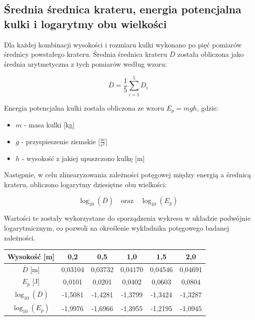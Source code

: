 \documentclass[a4paper,12pt]{article}
\begin{document}

\subsection{Średnia średnica krateru, energia potencjalna kulki i logarytmy obu wielkości}


Dla każdej kombinacji wysokości i rozmiaru kulki wykonano po pięć pomiarów średnicy powstałego krateru. Średnia średnica krateru $\overline{D}$ została obliczona jako średnia arytmetyczna z tych pomiarów według wzoru:

\[ \overline{D} = \frac{1}{5}\sum_{i=1}^{5} D_i \]

Energia potencjalna kulki została obliczona ze wzoru $E_p = mgh$, gdzie:
\begin{itemize}
    \item $m$ - masa kulki [kg]
    \item $g$ - przyspieszenie ziemskie [$\frac{m}{s^2}$]
    \item $h$ - wysokość z jakiej upuszczono kulkę [m]
\end{itemize}

Następnie, w celu zlinearyzowania zależności potęgowej między energią a średnicą krateru, obliczono logarytmy dziesiętne obu wielkości:

\[ \log_{10}(\overline{D}) \quad \text{oraz} \quad \log_{10}(E_p) \]

Wartości te zostały wykorzystane do sporządzenia wykresu w układzie podwójnie logarytmicznym, co pozwoli na określenie wykładnika potęgowego badanej zależności.


\begin{center}
    \begin{tabular}{|c|c|c|c|c|c|}
        \hline
        Wysokość [m] & 0,2 & 0,5 & 1,0 & 1,5 & 2,0 \\
        \hline
        $\overline{D}$ [m] & 0,03104 & 0,03732 & 0,04170 & 0,04546 & 0,04691 \\
        \hline
        $E_p$ [J] & 0,0101 & 0,0201 & 0,0402 & 0,0603 & 0,0804 \\
        \hline
        $\log_{10}(\overline{D})$ & -1,5081 & -1,4281 & -1,3799 & -1,3424 & -1,3287 \\
        \hline
        $\log_{10}(E_p)$ & -1,9976 & -1,6966 & -1,3955 & -1,2195 & -1,0945 \\
        \hline
    \end{tabular}
    \label{tab:wyniki_mala}
\end{center}
\end{document}
